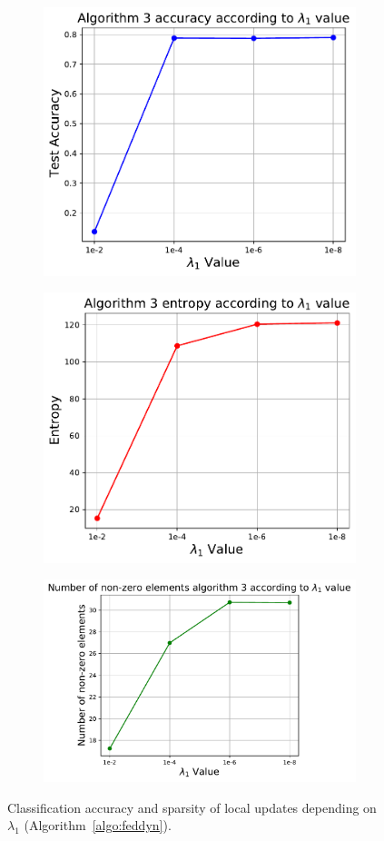 \documentclass{article} %
\begin{document}
\begin{figure}[ht!]
\begin{subfigure}{.5\textwidth}
  \centering
  \includegraphics[width=.8\linewidth]{textfigure/algo3acc.pdf}
  \label{fig:sub51}
\end{subfigure}
\begin{subfigure}{.5\textwidth}
  \centering
  \includegraphics[width=.8\linewidth]{textfigure/algo3entropy.pdf}
  \label{fig:sub52}
\end{subfigure}
\begin{subfigure}{1\textwidth}
  \centering
  \includegraphics[width=.6\linewidth]{textfigure/algo3nonzero.pdf}
  \label{fig:sub53}
\end{subfigure}
\caption{Classification accuracy and sparsity of local updates depending on $\lambda_{1}$ (Algorithm~\ref{algo:feddyn}).}
\label{fig:algo3 lambda1}
\end{figure}
\end{document}
